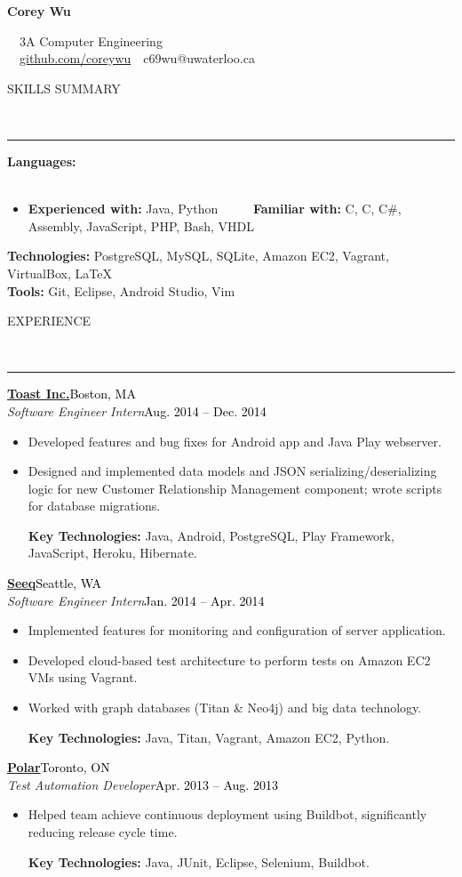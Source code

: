 \documentclass[11pt, letterpaper, oneside]{article}
\makeatletter
\newcommand{\name}{Corey Wu}
\newcommand{\program}{3A Computer Engineering}
\newcommand{\github}{\href{https://github.com/coreywu}{github.com/coreywu}}
\newcommand{\email}{c69wu@uwaterloo.ca}
\newcommand{\HRule}[2]{\textcolor{#1}{\rule{\linewidth}{#2}}}
\newcommand{\sectiontitle}[1]{\begin{minipage}{\textwidth}\vspace{-7.5pt}\begin{flushleft}\hspace{-20.5pt}\vspace{-25pt}
\Large\MakeUppercase{#1}\end{flushleft}\end{minipage}\\\HRule{black}{0.15mm}\vspace{\baselineskip}}
\newenvironment{ressection}[1]{
  \sectiontitle{#1}}
  {\vspace{-\baselineskip}}
\newcommand{\resentryheader}[4]{
    \vspace{-6pt}
    \textbf{#1}\hspace{\stretch{1}}\textcolor{black}{#3}\\
    \textit{#2}\hspace{\stretch{1}}\textcolor{black}{#4}\\
}
\newcommand{\resitem}[1]{
    \vspace{2pt}
    \item \begin{flushleft} #1 \end{flushleft}
}
\newcommand{\CPP}
{C\nolinebreak[4]\hspace{-.05em}\raisebox{.22ex}{\footnotesize\bf ++}}
\newenvironment{resentry}[4]{
  \begin{minipage}{\textwidth}
  \vspace{-3pt}
    \resentryheader{#1}{#2}{#3}{#4}
        \vspace{-\baselineskip}
    \begin{itemize}[noitemsep,nolistsep]
}{
    \end{itemize}
        \vspace{\baselineskip}
        \end{minipage}
}
\makeatother
\begin{document}
\begin{center}
	{\Huge \textbf{\name}}

	\ \ {\Large{\program}} \\
	\ \ \github \ \textbullet \ \email \ \
\end{center}

\vspace{-20pt}

\begin{ressection}{Skills Summary}
\begin{resentry}{Languages:}{}{}{}{}
\vspace{-16pt}
\resitem{\textbf{Experienced with:} Java, Python \ \ \ \ \textbullet \ \textbf{Familiar with:} C, \CPP, C\#, Assembly, JavaScript, PHP, Bash, VHDL}
\vspace{-10pt}
\end{resentry}
\textbf{Technologies:} PostgreSQL, MySQL, SQLite, Amazon EC2, Vagrant, VirtualBox,  \LaTeX
\\
\textbf{Tools:} Git, Eclipse, Android Studio, Vim
\end{ressection}
\vspace{14pt}

\begin{ressection}{Experience}
  \begin{resentry}{\href{http://pos.toasttab.com/}{Toast Inc.}}{Software Engineer Intern}{Boston, MA}{Aug. 2014 -- Dec. 2014}
    \resitem{Developed features and bug fixes for Android app and Java Play webserver.}
    \resitem{Designed and implemented data models and JSON serializing/deserializing logic for new Customer Relationship Management component; wrote scripts for database migrations. }
    \vspace{4pt} \hspace{-15pt}
    \textbf{Key Technologies:} Java, Android, PostgreSQL, Play Framework, JavaScript, Heroku, Hibernate.
  \end{resentry}  
  \begin{resentry}{\href{http://www.seeq.com/}{Seeq}}{Software Engineer Intern}{Seattle, WA}{Jan. 2014 -- Apr. 2014}
    \resitem{Implemented features for monitoring and configuration of server application. }
    \resitem{Developed cloud-based test architecture to perform tests on Amazon EC2 VMs using Vagrant.}
    \resitem{Worked with graph databases (Titan \& Neo4j) and big data technology.}
    \vspace{4pt} \hspace{-15pt}
    \textbf{Key Technologies:} Java, Titan, Vagrant, Amazon EC2, Python.
  \end{resentry}
  \begin{resentry}{\href{http://polar.me/}{Polar}}{Test Automation Developer}{Toronto, ON}{Apr. 2013 -- Aug. 2013}
    \resitem{Helped team achieve continuous deployment using Buildbot, significantly reducing release cycle time.}
    \vspace{4pt} \hspace{-15pt}
    \textbf{Key Technologies:} Java, JUnit, Eclipse, Selenium, Buildbot.
  \end{resentry}
\end{ressection}
\end{document}
